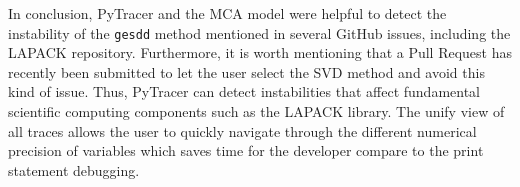 \documentclass[10pt,journal,compsoc]{IEEEtran}
\newcommand{\pytracer}[0]{PyTracer\xspace}
\DeclareRobustCommand{\add}[1]{#1}
\begin{document}
In conclusion, \pytracer and the MCA model were helpful to detect the
instability of the \texttt{gesdd} method mentioned in several GitHub issues,
including the LAPACK repository. Furthermore, it is worth mentioning that a Pull
Request has recently been submitted to let the user select the SVD method and
avoid this kind of issue. Thus, \pytracer can detect instabilities that affect
fundamental scientific computing components such as the LAPACK library. \add{The
    unify view of all traces allows the user to quickly navigate through the
    different numerical precision of variables which saves time for the developer
    compare to the print statement debugging.}
\end{document}
